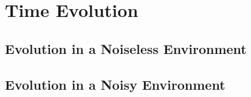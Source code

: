 \section{Time Evolution}\label{SEC:single_solution}

\subsection{Evolution in a Noiseless Environment}
\subsection{Evolution in a Noisy Environment}
